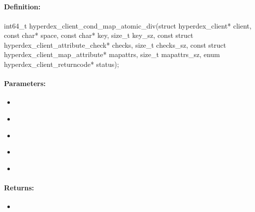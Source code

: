\pagebreak
\subsection{}
\label{api:c:cond_map_atomic_div}


\paragraph{Definition:}
\begin{ccode}
int64_t hyperdex_client_cond_map_atomic_div(struct hyperdex_client* client,
        const char* space,
        const char* key, size_t key_sz,
        const struct hyperdex_client_attribute_check* checks, size_t checks_sz,
        const struct hyperdex_client_map_attribute* mapattrs, size_t mapattrs_sz,
        enum hyperdex_client_returncode* status);
\end{ccode}

\paragraph{Parameters:}
\begin{itemize}[noitemsep]
\item {}\\

\item {}\\

\item {}\\

\item {}\\

\item {}\\

\end{itemize}

\paragraph{Returns:}
\begin{itemize}[noitemsep]
\item {}\\

\end{itemize}

